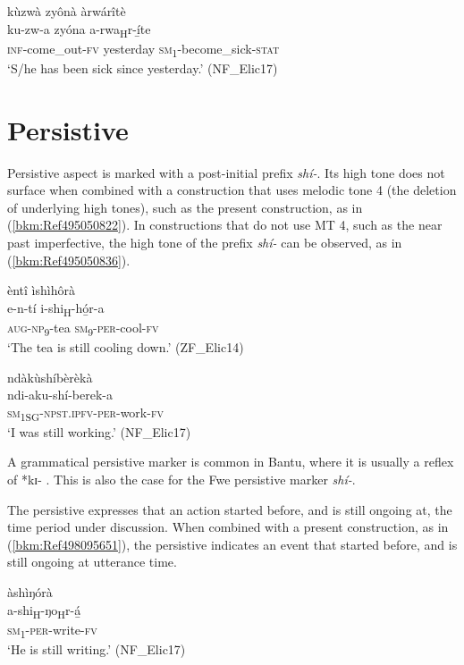 \ea
\label{bkm:Ref494986964}
kùzwà zyônà àrwárîtè\\
\gll ku-zw-a    zyóna    a-rwa\textsubscript{H}r-í̲te\\
\textsc{inf}-come\_out-\textsc{fv}  yesterday  \textsc{sm}\textsubscript{1}-become\_sick-\textsc{stat}\\
\glt ‘S/he has been sick since yesterday.’ (NF\_Elic17)
\z
\section{Persistive}
\label{bkm:Ref445905502}\hypertarget{Toc75352697}{}
Persistive aspect is marked with a post-initial prefix \textit{shí-}. Its high tone does not surface when combined with a construction that uses melodic tone 4 (the deletion of underlying high tones), such as the present construction, as in (\ref{bkm:Ref495050822}). In constructions that do not use MT 4, such as the near past imperfective, the high tone of the prefix \textit{shí-} can be observed, as in (\ref{bkm:Ref495050836}).

\ea
\label{bkm:Ref495050822}
èntî ìshìhôrà\\
\gll e-n-tí    i-shi\textsubscript{H}-hó̲r-a\\
\textsc{aug}-\textsc{np}\textsubscript{9}-tea  \textsc{sm}\textsubscript{9}-\textsc{per}-cool-\textsc{fv}\\
\glt ‘The tea is still cooling down.’ (ZF\_Elic14)
\z

\ea
\label{bkm:Ref495050836}
\glll ndàkùshíbèrèkà\\
ndi-aku-shí-berek-a\\
\textsc{sm}\textsubscript{1SG}-\textsc{npst}.\textsc{ipfv}-\textsc{per}-work-\textsc{fv}\\
\glt ‘I was still working.’ (NF\_Elic17)
\z

A grammatical persistive marker is common in Bantu, where it is usually a reflex of *kɪ- \citep{Nurse2008}. This is also the case for the Fwe persistive marker \textit{shí-}.

The persistive expresses that an action started before, and is still ongoing at, the time period under discussion. When combined with a present construction, as in (\ref{bkm:Ref498095651}), the persistive indicates an event that started before, and is still ongoing at utterance time.

\ea
\label{bkm:Ref498095651}
\glll àshìŋórà\\
a-shi\textsubscript{H}-ŋo\textsubscript{H}r-á̲\\
\textsc{sm}\textsubscript{1}-\textsc{per}-write-\textsc{fv}\\
\glt ‘He is still writing.’ (NF\_Elic17)
\z

